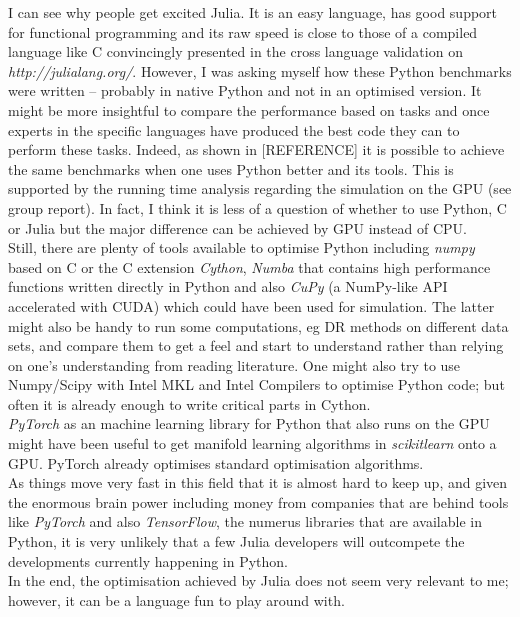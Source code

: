 \documentclass[journal, a4paper]{IEEEtran}
\begin{document}
I can see why people get excited Julia. It is an easy language, has good support for functional programming and its raw speed is close to those of a compiled language like C convincingly presented in the cross language validation on \textit{http://julialang.org/}. 
However, I was asking myself how these Python benchmarks were written -- probably in native Python and not in an optimised version. It might be more insightful to compare the performance based on tasks and once experts in the specific languages have produced the best code they can to perform these tasks. Indeed, as shown in [REFERENCE] it is possible to achieve the same benchmarks when one uses Python better and its tools. This is supported by the running time analysis regarding the simulation on the GPU (see group report).
In fact, I think it is less of a question of whether to use Python, C or Julia but the major difference can be achieved by GPU instead of CPU.\\
Still, there are plenty of tools available to optimise Python including \textit{numpy} based on C or the C extension \textit{Cython}, \textit{Numba} that contains high performance functions written directly in Python and also \textit{CuPy} (a NumPy-like API accelerated with CUDA) which could have been used for simulation. The latter might also be handy to run some computations, eg DR methods on different data sets, and compare them to get a feel and start to understand rather than relying on one's understanding from reading literature. One might also try to use Numpy/Scipy with Intel MKL and Intel Compilers to optimise Python code; but often it is already enough to write critical parts in Cython.\\
\textit{PyTorch} as an machine learning library for Python that also runs on the GPU might have been useful to get manifold learning algorithms in \textit{scikitlearn} onto a GPU. PyTorch already optimises standard optimisation algorithms.  \\

As things move very fast in this field that it is almost hard to keep up, and given the enormous brain power including money from companies that are behind tools like \textit{PyTorch} and also \textit{TensorFlow}, the numerus libraries that are available in Python, it is very unlikely that a few Julia developers will outcompete the developments currently happening in Python. \\

In the end, the optimisation achieved by Julia does not seem very relevant to me; however, it can be a language fun to play around with.
\end{document}
